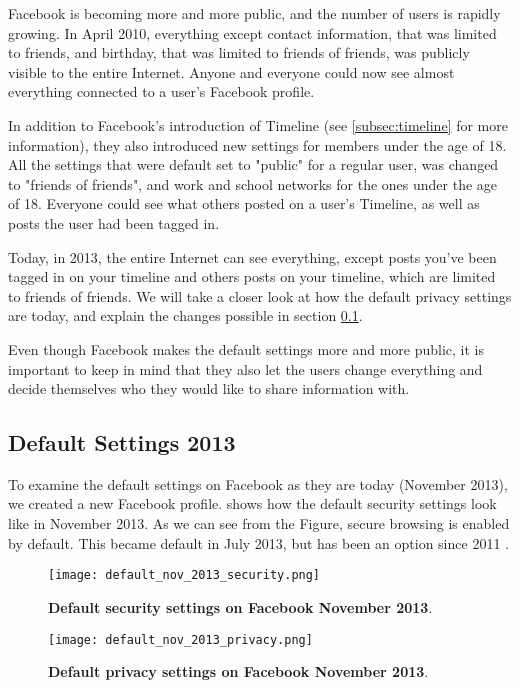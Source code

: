 Facebook is becoming more and more public, and the number of users is rapidly growing. In April 2010, everything except contact information, that was limited to friends, and birthday, that was limited to friends of friends, was publicly visible to the entire Internet. Anyone and everyone could now see almost everything connected to a user's Facebook profile. 

In addition to Facebook's introduction of Timeline (see \ref{subsec:timeline} for more information), they also introduced new settings for members under the age of 18. All the settings that were default set to "public" for a regular user, was changed to "friends of friends", and work and school networks for the ones under the age of 18. Everyone could see what others posted on a user's Timeline, as well as posts the user had been tagged in.

Today, in 2013, the entire Internet can see everything, except posts you've been tagged in on your timeline and others posts on your timeline, which are limited to friends of friends. We will take a closer look at how the default privacy settings are today, and explain the changes possible in section \ref{subsec:default2013}. 

Even though Facebook makes the default settings more and more public, it is important to keep in mind that they also let the users change everything and decide themselves who they would like to share information with.   


\subsection{Default Settings 2013}
\label{subsec:default2013}

To examine the default settings on Facebook as they are today (November 2013), we created a new Facebook profile.  shows how the default security settings look like in November 2013. As we can see from the Figure, secure browsing is enabled by default. This became default in July 2013, but has been an option since 2011 \cite{secureBrowsing}. 

\begin{figure}[b]
\centering
\texttt{[image: default\_nov\_2013\_security.png]}
\caption[Default security settings on Facebook November 2013]{\textbf{Default security settings on Facebook November 2013}.} 
\label{fig:security2013}
\end{figure}

\begin{figure}[t]
\centering
\texttt{[image: default\_nov\_2013\_privacy.png]}
\caption[Default privacy settings on Facebook November 2013]{\textbf{Default privacy settings on Facebook November 2013}.} 
\label{fig:privacy2013}
\end{figure}

